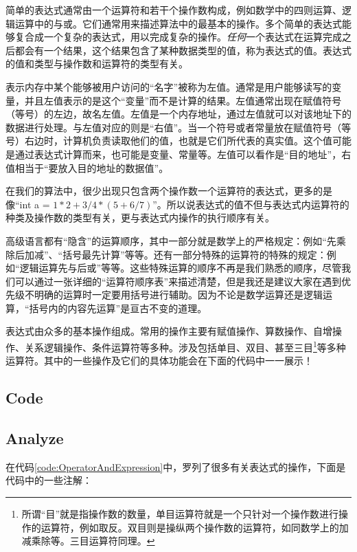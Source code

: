 简单的表达式通常由一个运算符和若干个操作数构成，例如数学中的四则运算、逻辑运算中的与或。它们通常用来描述算法中的最基本的操作。多个简单的表达式能够复合成一个复杂的表达式，用以完成复杂的操作。\emph{任何}一个表达式在运算完成之后都会有一个结果，这个结果包含了某种数据类型的值，称为表达式的值。表达式的值和类型与操作数和运算符的类型有关。

表示内存中某个能够被用户访问的“名字”被称为左值。通常是用户能够读写的变量，并且左值表示的是这个“变量”而不是计算的结果。左值通常出现在赋值符号（等号）的左边，故名左值。左值是一个内存地址，通过左值就可以对该地址下的数据进行处理。与左值对应的则是“右值”。当一个符号或者常量放在赋值符号（等号）右边时，计算机负责读取他们的值，也就是它们所代表的真实值。这个值可能是通过表达式计算而来，也可能是变量、常量等。左值可以看作是“目的地址”，右值相当于“要放入目的地址的数据值”。

在我们的算法中，很少出现只包含两个操作数一个运算符的表达式，更多的是像“int a = $1*2+3/4*(5+6/7)$”。所以说表达式的值不但与表达式内运算符的种类及操作数的类型有关，更与表达式内操作的执行顺序有关。

高级语言都有“隐含”的运算顺序，其中一部分就是数学上的严格规定：例如“先乘除后加减”、“括号最先计算”等等。还有一部分特殊的运算符的特殊的规定：例如“逻辑运算先与后或”等等。这些特殊运算的顺序不再是我们熟悉的顺序，尽管我们可以通过一张详细的“运算符顺序表”来描述清楚，但是我还是建议大家在遇到优先级不明确的运算时一定要用括号进行辅助。因为不论是数学运算还是逻辑运算，“括号内的内容先运算”是亘古不变的道理。

表达式由众多的基本操作组成。常用的操作主要有赋值操作、算数操作、自增操作、关系逻辑操作、条件运算符等多种。涉及包括单目、双目、甚至三目\footnote{所谓“目”就是指操作数的数量，单目运算符就是一个只针对一个操作数进行操作的运算符，例如取反。双目则是操纵两个操作数的运算符，如同数学上的加减乘除等。三目运算符同理。}等多种运算符。其中的一些操作及它们的具体功能会在下面的代码中一一展示！

\subsection{Code}



\subsection{Analyze}


在代码\ref{code:OperatorAndExpression}中，罗列了很多有关表达式的操作，下面是代码中的一些注解：
\begin{quote}
\showremarks
\end{quote}

